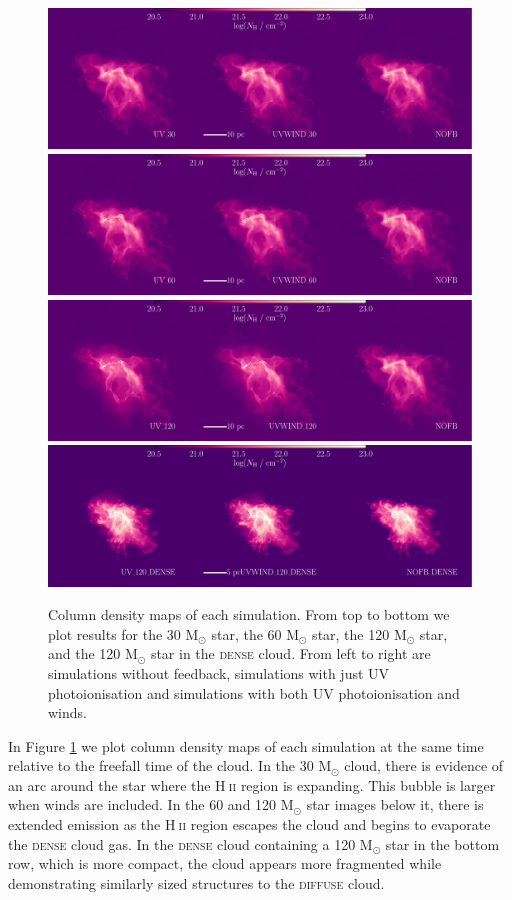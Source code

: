 \documentclass[a4paper,fleqn,usenatbib]{mnras}
\newcommand{\Msolar}{M$_{\odot}$\xspace}
\newcommand{\HII}{H$~$\textsc{ii}\xspace}
\begin{document}
\begin{figure}
	\includegraphics[width=2\columnwidth]{plots/fig1a.pdf}
	\includegraphics[width=2\columnwidth]{plots/fig1b.pdf}
	\includegraphics[width=2\columnwidth]{plots/fig1c.pdf}
	\includegraphics[width=2\columnwidth]{plots/fig1d.pdf}
	\caption{Column density maps of each simulation. From top to bottom we plot results for the 30 \Msolar star, the 60 \Msolar star, the 120 \Msolar star, and the 120 \Msolar star in the \textsc{dense} cloud. From left to right are simulations without feedback, simulations with just UV photoionisation and simulations with both UV photoionisation and winds.}
	\label{fig:columndensity}
\end{figure}

In Figure \ref{fig:columndensity} we plot column density maps of each simulation at the same time relative to the freefall time of the cloud. In the 30 \Msolar cloud, there is evidence of an arc around the star where the \HII region is expanding. This bubble is larger when winds are included. In the 60 and 120 \Msolar star images below it, there is extended emission as the \HII region escapes the cloud and begins to evaporate the \textsc{dense} cloud gas. In the \textsc{dense} cloud containing a 120 \Msolar star in the bottom row, which is more compact, the cloud appears more fragmented while demonstrating similarly sized structures to the \textsc{diffuse} cloud.
\end{document}
